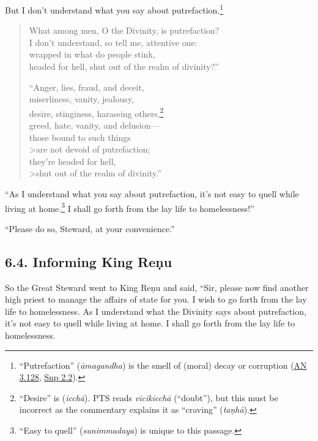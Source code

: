 \documentclass[12pt,openany]{book}%
\begin{document}
But I don’t understand what you say about putrefaction.\footnote{“Putrefaction” (\textit{\textsanskrit{āmagandha}}) is the smell of (moral) decay or corruption (\href{https://suttacentral.net/an3.128/en/sujato}{AN 3.128}, \href{https://suttacentral.net/snp2.2/en/sujato}{Snp 2.2}). } 

\begin{verse}%
What among men, O the Divinity, is putrefaction? \\
I don’t understand, so tell me, attentive one: \\
wrapped in what do people stink, \\
headed for hell, shut out of the realm of divinity?” 

“Anger, lies, fraud, and deceit, \\
miserliness, vanity, jealousy, \\
desire, stinginess, harassing others,\footnote{“Desire” is (\textit{\textsanskrit{icchā}}). PTS reads \textit{\textsanskrit{vicikicchā}} (“doubt”), but this must be incorrect as the commentary explains it as “craving” (\textit{\textsanskrit{taṇhā}}). } \\
greed, hate, vanity, and delusion—\\
those bound to such things \\>are not devoid of putrefaction; \\
they’re headed for hell, \\>shut out of the realm of divinity.” 

%
\end{verse}

“As I understand what you say about putrefaction, it’s not easy to quell while living at home.\footnote{“Easy to quell” (\textit{sunimmadaya}) is unique to this passage. } I shall go forth from the lay life to homelessness!” 

“Please do so, Steward, at your convenience.” 

\subsection*{6.4. Informing King \textsanskrit{Reṇu} }

So the Great Steward went to King \textsanskrit{Reṇu} and said, “Sir, please now find another high priest to manage the affairs of state for you. I wish to go forth from the lay life to homelessness. As I understand what the Divinity says about putrefaction, it’s not easy to quell while living at home. I shall go forth from the lay life to homelessness. 
\end{document}
